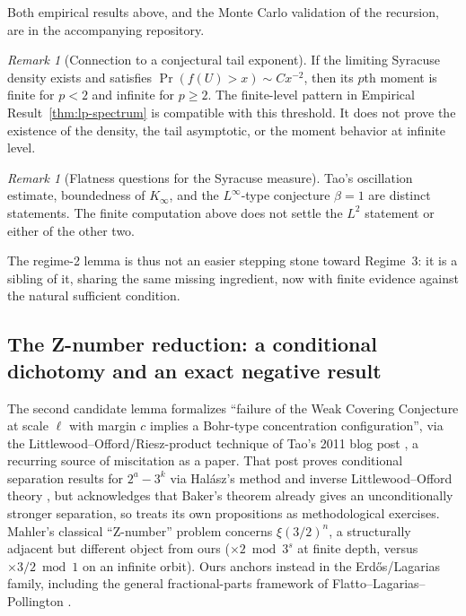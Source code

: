 \documentclass[11pt]{article}
\theoremstyle{definition}
\theoremstyle{remark}
\newtheorem{remark}[theorem]{Remark}
\begin{document}
Both empirical results above, and the Monte Carlo validation of the
recursion, are in the accompanying repository.

\begin{remark}[Connection to a conjectural tail exponent]
If the limiting Syracuse density exists and satisfies
$\Pr(f(U)>x)\sim Cx^{-2}$, then its $p$th moment is finite for $p<2$ and
infinite for $p\ge2$. The finite-level pattern in Empirical
Result~\ref{thm:lp-spectrum} is compatible with this threshold. It does
not prove the existence of the density, the tail asymptotic, or the
moment behavior at infinite level.
\end{remark}

\begin{remark}[Flatness questions for the Syracuse measure]
Tao's oscillation estimate, boundedness of $K_\infty$, and the
$L^\infty$-type conjecture $\beta=1$ are distinct statements. The
finite computation above does not settle the $L^2$ statement or either
of the other two.
\end{remark}

The regime-2 lemma is thus not an easier stepping stone toward
Regime~3: it is a sibling of it, sharing the same missing ingredient,
now with finite evidence against the natural sufficient condition.

\subsection{The Z-number reduction: a conditional dichotomy and an
exact negative result}

The second candidate lemma formalizes ``failure of the Weak Covering
Conjecture at scale $\ell$ with margin $c$ implies a Bohr-type
concentration configuration'', via the Littlewood--Offord/Riesz-product
technique of Tao's 2011 blog post \cite{Tao2011}, a recurring source of
miscitation as a paper. That post proves conditional separation
results for $2^a-3^k$ via Halász's method \cite{Halasz1977} and inverse
Littlewood--Offord theory \cite{TaoVu2009,NguyenVu2011}, but
acknowledges that Baker's theorem already gives an unconditionally
stronger separation, so treats its own propositions as methodological
exercises. Mahler's classical ``Z-number'' problem \cite{Mahler1968}
concerns $\xi(3/2)^n$, a structurally adjacent but different object
from ours ($\times2\bmod3^s$ at finite depth, versus $\times3/2\bmod1$
on an infinite orbit). Ours anchors instead in the Erdős/Lagarias family,
including the general fractional-parts framework of
Flatto--Lagarias--Pollington
\cite{Erdos1979,Lagarias2009,FlattoLagariasPollington1995}.
\end{document}
